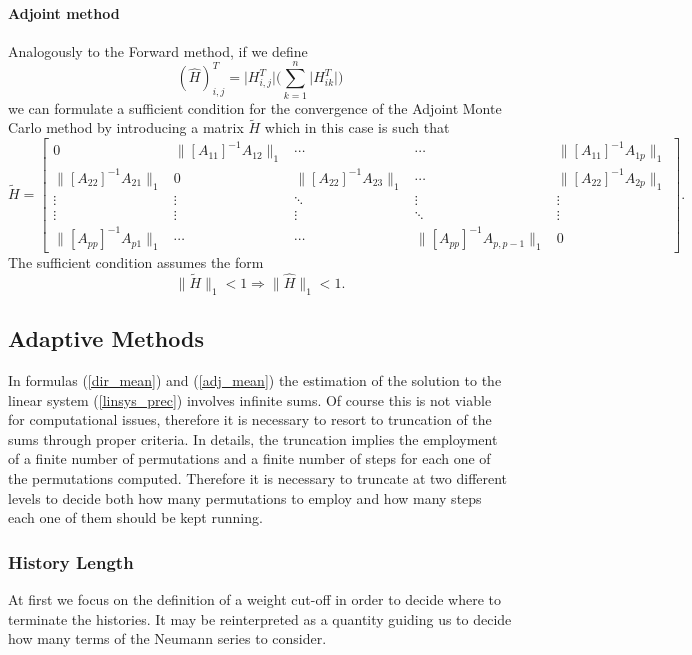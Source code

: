 \paragraph{Adjoint method}
Analogously to the Forward method, if we define
\[
(\hat{H})^T_{i,j} = \lvert H^T_{i,j}\rvert\bigg(\sum_{k=1}^n\lvert
H^T_{ik}\rvert\bigg)
\]
we can formulate a sufficient condition for the convergence of the Adjoint
Monte
Carlo method by introducing a matrix $\tilde{H}$ which in this case is such that
\[
  \tilde{H}=\begin{bmatrix}0 & \lVert [A_{11}]^{-1}A_{12}\rVert_{1} & \cdots
&
\cdots & \lVert [A_{11}]^{-1}A_{1p}\rVert_{1} \\
\lVert [A_{22}]^{-1}A_{21}\rVert_{1} & 0 & \lVert
[A_{22}]^{-1}A_{23}\rVert_{1} &
\cdots & \lVert [A_{22}]^{-1}A_{2p}\rVert_{1} \\
\vdots & \vdots & \ddots & \vdots & \vdots\\
\vdots & \vdots & \vdots &\ddots & \vdots \\
\lVert [A_{pp}]^{-1}A_{p1}\rVert_{1} &  \cdots & \cdots&
\lVert [A_{pp}]^{-1}A_{p,p-1}\rVert_{1} & 0
\end{bmatrix}.
\]
The sufficient condition assumes the form
\begin{equation}
 \lVert \tilde{H} \rVert_{1}<1 \Rightarrow \lVert \hat{H} \rVert_{1}<1.
\end{equation}

\subsection{Adaptive Methods}

In formulas (\ref{dir_mean}) and (\ref{adj_mean}) the estimation of the
solution to
the linear system (\ref{linsys_prec}) involves infinite sums. Of course this is
not viable for
computational issues, therefore it is necessary to resort to truncation of
the sums through proper criteria. In details, the truncation implies the
employment of a finite number of permutations and a finite number of
steps for each one of the permutations computed. Therefore it is necessary to
truncate at two different levels to decide both how many permutations to employ
and how many steps each one of them should be kept running.

\subsubsection{History Length}

At first we focus on the definition of a weight cut-off
in order to decide where to terminate the histories. It may be reinterpreted as
a quantity guiding us to decide how many terms of the Neumann
series to consider. \newline


